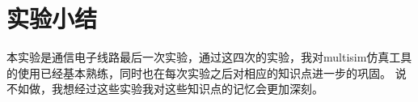 \documentclass[UTF8]{ctexart}
\begin{document}
\section{实验小结}
本实验是通信电子线路最后一次实验，通过这四次的实验，我对multisim仿真工具的使用已经基本熟练，同时也在每次实验之后对相应的知识点进一步的巩固。
说不如做，我想经过这些实验我对这些知识点的记忆会更加深刻。
\end{document}
